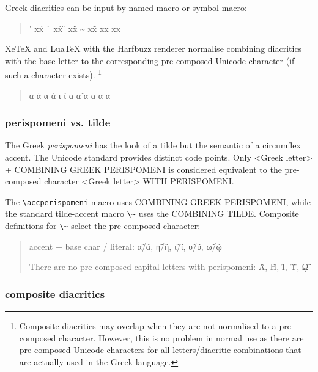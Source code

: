 \documentclass[a4paper]{scrartcl}
\begin{document}
Greek diacritics can be input by named macro or symbol macro:
\begin{quote}
  \acctonos\textalpha       \'\textalpha{}  \acctonos       x\'x
  \accvaria\textalpha       \`\textalpha{}  \accvaria       x\`x
  \accdialytika\textiota    \"\textiota{}   \accdialytika   x\"x
  \accperispomeni\textalpha \~\textalpha{}  \accperispomeni x\~x
  \accpsili\textalpha       \>\textalpha{}  \accpsili       x\>x
  \accdasia\textalpha       \<\textalpha{}  \accdasia       x\<x
\end{quote}
%
XeTeX and LuaTeX with the Harfbuzz renderer normalise combining diacritics
with the base letter to the corresponding pre-composed Unicode character
(if such a character exists).%
\footnote{\label{fnt:overlap}
  Composite diacritics may overlap when they are not normalised to a
  pre-composed character.
  However, this is no problem in normal use as there are pre-composed
  Unicode characters for all letters/diacritic combinations that are
  actually used in the Greek language.%
}
\begin{quote}
  \acctonos α       \'α
  \accvaria α       \`α
  \accdialytika ι   \"ι
  \accperispomeni α \~α
  \accpsili α       \>α
  \accdasia α       \<α
\end{quote}

\subsubsection{perispomeni vs. tilde}

The Greek \emph{perispomeni} has the look of a tilde but the semantic of
a circumflex accent. The Unicode standard provides distinct code points.
Only <Greek letter> + COMBINING GREEK PERISPOMENI is considered equivalent
to the pre-composed character <Greek letter> WITH PERISPOMENI.

The \verb|\accperispomeni| macro uses COMBINING GREEK PERISPOMENI,
while the standard tilde-accent macro \verb|\~| uses the COMBINING TILDE.
Composite definitions for \verb|\~| select the pre-composed character:

\begin{quote}
  accent + base char / literal:
  \~α/ᾶ, \~η/ῆ, \~ι/ῖ, \~υ/ῦ, \~ω\ypogegrammeni{}/ῷ

  There are no pre-composed capital letters with perispomeni:
  \~Α, \~Η, \~Ι, \~Υ, \~ῼ 
\end{quote}


\subsubsection{composite diacritics}
\end{document}
